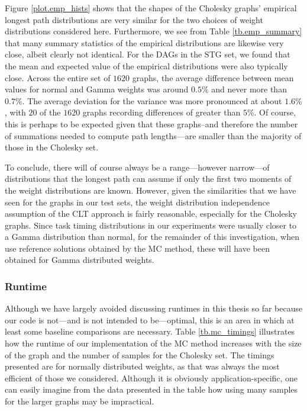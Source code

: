 \documentclass[12pt]{article}
\begin{document}
      Figure \ref{plot.emp_hists} shows that the shapes of the Cholesky graphs' empirical longest path distributions are very similar for the two choices of weight distributions considered here. Furthermore, we see from Table \ref{tb.emp_summary} that many summary statistics of the empirical distributions are likewise very close, albeit clearly not identical. For the DAGs in the STG set, we found that the mean and expected value of the empirical distributions were also typically close. Across the entire set of $1620$ graphs, the average difference between mean values for normal and Gamma weights was around $0.5\%$ and never more than $0.7\%$. The average deviation for the variance was more pronounced at about $1.6\%$, with $20$ of the $1620$ graphs recording differences of greater than $5\%$. Of course, this is perhaps to be expected given that these graphs--and therefore the number of summations needed to compute path lengths---are smaller than the majority of those in the Cholesky set.

      To conclude, there will of course always be a range---however narrow---of distributions that the longest path can assume if only the first two moments of the weight distributions are known. However, given the similarities that we have seen for the graphs in our test sets, the weight distribution independence assumption of the CLT approach is fairly reasonable, especially for the Cholesky graphs. Since task timing distributions in our experiments were usually closer to a Gamma distribution than normal, for the remainder of this investigation, when use reference solutions obtained by the MC method, these will have been obtained for Gamma distributed weights. 

\subsubsection{Runtime}
\label{subsubsect.runtime}

Although we have largely avoided discussing runtimes in this thesis so far because our code is not---and is not intended to be---optimal, this is an area in which at least some baseline comparisons are necessary. Table \ref{tb.mc_timings} illustrates how the runtime of our implementation of the MC method increases with the size of the graph and the number of samples for the Cholesky set. The timings presented are for normally distributed weights, as that was always the most efficient of those we considered. Although it is obviously application-specific, one can easily imagine from the data presented in the table how using many samples for the larger graphs may be impractical. 
\end{document}
